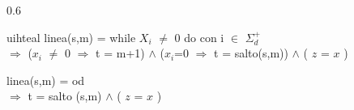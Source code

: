 \documentclass[xcolor=table]{beamer}
\begin{document}
\begin{frame}[fragile]
\begin{columns}
\begin{column}{0.6\textwidth}
\begin{colorblock}[white]{uihteal}{}
linea(s,m) = while $X_i$ $\neq$ 0 do con i $\in$ $\Sigma_d^+$\\
\hspace{0.3cm} $\Rightarrow$ ($x_i$ $\neq$ 0 $\Rightarrow$ t = m+1) 
$\wedge$ ($x_i$=0 $\Rightarrow$ t = salto(s,m)) $\wedge$ ( \underline{$z$} =  \underline{$x$} ) 

linea(s,m) = od \\
\hspace{0.3cm} $\Rightarrow$ t = salto (s,m) $\wedge$ ( \underline{$z$} =  \underline{$x$} ) 
\end{colorblock}

\end{column}
\end{columns}
\end{frame}
\end{document}
